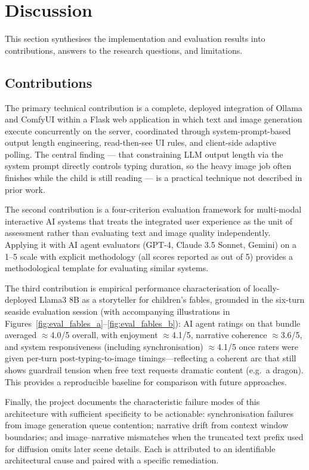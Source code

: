 \documentclass[12pt,a4paper]{article}
\begin{document}
    \section{Discussion}

This section synthesises the implementation and evaluation results into contributions, answers to the research questions, and limitations.

    \subsection{Contributions}

The primary technical contribution is a complete, deployed integration of Ollama and ComfyUI within a Flask web application in which text and image generation execute concurrently on the server, coordinated through system-prompt-based output length engineering, read-then-see UI rules, and client-side adaptive polling. The central finding --- that constraining LLM output length via the system prompt directly controls typing duration, so the heavy image job often finishes while the child is still reading --- is a practical technique not described in prior work.

The second contribution is a four-criterion evaluation framework for multi-modal interactive AI systems that treats the integrated user experience as the unit of assessment rather than evaluating text and image quality independently. Applying it with AI agent evaluators (GPT-4, Claude 3.5 Sonnet, Gemini) on a 1--5 scale with explicit methodology (all scores reported as out of 5) provides a methodological template for evaluating similar systems.

The third contribution is empirical performance characterisation of locally-deployed Llama3 8B as a storyteller for children's fables, grounded in the six-turn seaside evaluation session (with accompanying illustrations in Figures~\ref{fig:eval_fables_a}--\ref{fig:eval_fables_b}): AI agent ratings on that bundle averaged $\approx$4.0/5 overall, with enjoyment $\approx$4.1/5, narrative coherence $\approx$3.6/5, and system responsiveness (including synchronisation) $\approx$4.1/5 once raters were given per-turn post-typing-to-image timings---reflecting a coherent arc that still shows guardrail tension when free text requests dramatic content (e.g.\ a dragon). This provides a reproducible baseline for comparison with future approaches.

Finally, the project documents the characteristic failure modes of this architecture with sufficient specificity to be actionable: synchronisation failures from image generation queue contention; narrative drift from context window boundaries; and image--narrative mismatches when the truncated text prefix used for diffusion omits later scene details. Each is attributed to an identifiable architectural cause and paired with a specific remediation.
\end{document}
